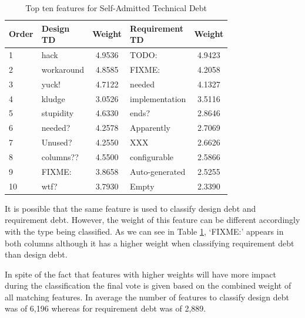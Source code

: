 \begin{table}[!hbt]
    \begin{center}
        \caption{Top ten features for Self-Admitted Technical Debt}
        \label{tbl:top_ten_features}
        \begin{tabular}{l| l c | l c }
        \toprule
        \textbf{Order} & \thead{Design\\TD} & \textbf{Weight} & \thead{Requirement\\TD}  & \textbf{Weight}\\
        \midrule
         1  & hack        &  4.9536 &  TODO:           &  4.9423 \\
         2  & workaround  &  4.8585 &  FIXME:          &  4.2058 \\
         3  & yuck!       &  4.7122 &  needed          &  4.1327 \\
         4  & kludge      &  3.0526 &  implementation  &  3.5116 \\
         5  & stupidity   &  4.6330 &  ends?           &  2.8646 \\
         6  & needed?     &  4.2578 &  Apparently      &  2.7069 \\
         7  & Unused?     &  4.2550 &  XXX             &  2.6626 \\
         8  & columns??   &  4.5500 &  configurable    &  2.5866 \\
         9  & FIXME:      &  3.8658 &  Auto-generated  &  2.5255 \\
         10 & wtf?        &  3.7930 &  Empty           &  2.3390 \\
        \bottomrule
        \end{tabular}
    \end{center}    
\end{table}

It is possible that the same feature is used to classify design debt and requirement debt. However, the weight of this feature can be different accordingly with the type being classified. As we can see in Table \ref{tbl:top_ten_features}, `FIXME:' appears in both columns although it has a higher weight when classifying requirement debt than design debt. 

In spite of the fact that features with higher weights will have more impact during the classification the final vote is given based on the combined weight of all matching features. In average the number of features to classify design debt was of 6,196 whereas for requirement debt was of 2,889.

